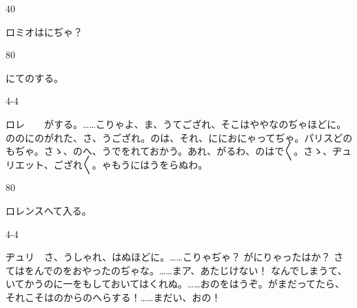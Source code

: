 \documentclass[tate,paper=b6j,jafontsize=9pt]{jlreq}
\begin{document}
\begin{azconvIndented}{4\zw}{0\zw}

ロミオはにぢゃ？

\end{azconvIndented}
\begin{azconvIndented}{8\zw}{0\zw}

にてのする。

\end{azconvIndented}
\begin{azconvIndented}{4\zw}{-4\zw}

ロレ　　がする。……こりゃよ、ま、うてござれ、そこはややなのぢゃほどに。ののにのがれた、さ、うござれ。のは、それ、ににおにゃってぢゃ。パリスどのもぢゃ。さゝ、のへ、うでをれておかう。あれ、がるわ、のはで{〳〵}。さゝ、ヂュリエット、ござれ{〳〵}。ゃもうにはうをらぬわ。

\end{azconvIndented}
\begin{azconvIndented}{8\zw}{0\zw}

ロレンスへて入る。

\end{azconvIndented}
\begin{azconvIndented}{4\zw}{-4\zw}

ヂュリ　さ、うしゃれ、はぬほどに。……こりゃぢゃ？ がにりゃったはか？ さてはをんでのをおやったのぢゃな。……まア、あたじけない！ なんでしまうて、いてかうのに一をもしておいてはくれぬ。……おのをはうぞ。がまだってたら、それこそはのからのへらする！……まだい、おの！

\end{azconvIndented}
\end{document}
